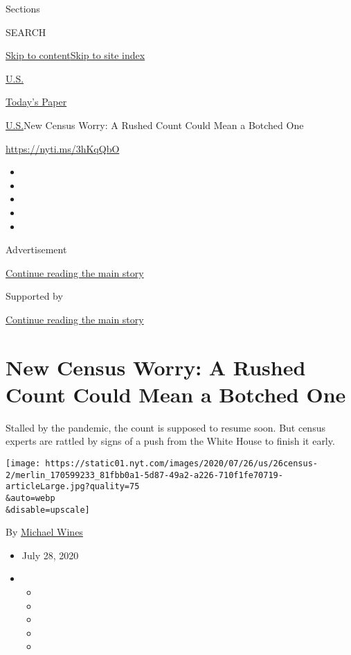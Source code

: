 Sections

SEARCH

\protect\hyperlink{site-content}{Skip to
content}\protect\hyperlink{site-index}{Skip to site index}

\href{https://www.nytimes.com/section/us}{U.S.}

\href{https://myaccount.nytimes.com/auth/login?response_type=cookie\&client_id=vi}{}

\href{https://www.nytimes.com/section/todayspaper}{Today's Paper}

\href{/section/us}{U.S.}\textbar{}New Census Worry: A Rushed Count Could
Mean a Botched One

\url{https://nyti.ms/3hKqQbO}

\begin{itemize}
\item
\item
\item
\item
\item
\end{itemize}

Advertisement

\protect\hyperlink{after-top}{Continue reading the main story}

Supported by

\protect\hyperlink{after-sponsor}{Continue reading the main story}

\hypertarget{new-census-worry-a-rushed-count-could-mean-a-botched-one}{%
\section{New Census Worry: A Rushed Count Could Mean a Botched
One}\label{new-census-worry-a-rushed-count-could-mean-a-botched-one}}

Stalled by the pandemic, the count is supposed to resume soon. But
census experts are rattled by signs of a push from the White House to
finish it early.

\texttt{[image: https://static01.nyt.com/images/2020/07/26/us/26census-2/merlin\_170599233\_81fbb0a1-5d87-49a2-a226-710f1fe70719-articleLarge.jpg?quality=75\\\&auto=webp\\\&disable=upscale]}

By \href{https://www.nytimes.com/by/michael-wines}{Michael Wines}

\begin{itemize}
\item
  July 28, 2020
\item
  \begin{itemize}
  \item
  \item
  \item
  \item
  \item
  \end{itemize}
\end{itemize}

